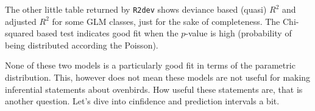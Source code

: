 \documentclass[12pt,]{book}
\newenvironment{Shaded}{\begin{snugshade}}{\end{snugshade}}
\newcommand{\CommentTok}[1]{\textcolor[rgb]{0.56,0.35,0.01}{\textit{#1}}}
\newcommand{\DataTypeTok}[1]{\textcolor[rgb]{0.13,0.29,0.53}{#1}}
\newcommand{\DecValTok}[1]{\textcolor[rgb]{0.00,0.00,0.81}{#1}}
\newcommand{\FloatTok}[1]{\textcolor[rgb]{0.00,0.00,0.81}{#1}}
\newcommand{\KeywordTok}[1]{\textcolor[rgb]{0.13,0.29,0.53}{\textbf{#1}}}
\newcommand{\NormalTok}[1]{#1}
\newcommand{\OperatorTok}[1]{\textcolor[rgb]{0.81,0.36,0.00}{\textbf{#1}}}
\newcommand{\StringTok}[1]{\textcolor[rgb]{0.31,0.60,0.02}{#1}}
\begin{document}
The other little table returned by \texttt{R2dev} shows deviance based (quasi) \(R^2\) and adjusted
\(R^2\) for some GLM classes, just for the sake of completeness. The Chi-squared based
test indicates good fit when the \(p\)-value is high (probability of being distributed
according the Poisson).

None of these two models is a particularly good fit in terms
of the parametric distribution.
This, however does not mean these models are not useful for making inferential statements
about ovenbirds. How useful these statements are, that is another question.
Let's dive into cinfidence and prediction intervals a bit.

\begin{Shaded}
\end{Shaded}
\end{document}
